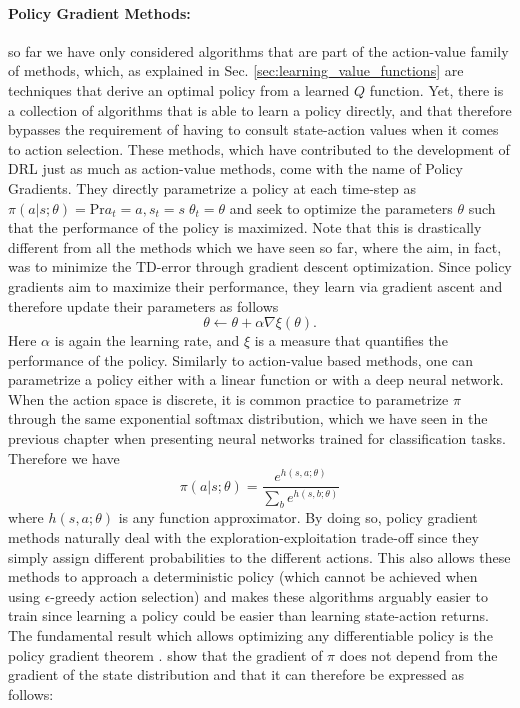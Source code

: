 \paragraph{Policy Gradient Methods:} so far we have only considered algorithms that are part of the action-value family of methods, which, as explained in Sec. \ref{sec:learning_value_functions} are techniques that derive an optimal policy from a learned $Q$ function. Yet, there is a collection of algorithms that is able to learn a policy directly, and that therefore bypasses the requirement of having to consult state-action values when it comes to action selection. These methods, which have contributed to the development of DRL just as much as action-value methods, come with the name of Policy Gradients. They directly parametrize a policy at each time-step as $\pi(a|s;\theta)=\text{Pr}{a_t = a, s_t=s\;\theta_t=\theta}$ and seek to optimize the parameters $\theta$ such that the performance of the policy is maximized. Note that this is drastically different from all the methods which we have seen so far, where the aim, in fact, was to minimize the TD-error through gradient descent optimization. Since policy gradients aim to maximize their performance, they learn via gradient ascent and therefore update their parameters as follows
\begin{equation}
	\theta \leftarrow \theta + \alpha \nabla \xi(\theta).
\end{equation}
Here $\alpha$ is again the learning rate, and $\xi$ is a measure that quantifies the performance of the policy. Similarly to action-value based methods, one can parametrize a policy either with a linear function or with a deep neural network. When the action space is discrete, it is common practice to parametrize $\pi$ through the same exponential softmax distribution, which we have seen in the previous chapter when presenting neural networks trained for classification tasks. Therefore we have
\begin{equation}
	\pi(a|s;\theta) = \frac{e^{h(s,a;\theta)}}{\sum_b e^{h(s,b;\theta)}}
\end{equation}
where $h(s,a;\theta)$ is any function approximator. By doing so, policy gradient methods naturally deal with the exploration-exploitation trade-off since they simply assign different probabilities to the different actions. This also allows these methods to approach a deterministic policy (which cannot be achieved when using $\epsilon$-greedy action selection) and makes these algorithms arguably easier to train since learning a policy could be easier than learning state-action returns. The fundamental result which allows optimizing any differentiable policy is the policy gradient theorem \cite{sutton1999policy}. \citet{sutton1999policy} show that the gradient of $\pi$ does not depend from the gradient of the state distribution and that it can therefore be expressed as follows:
